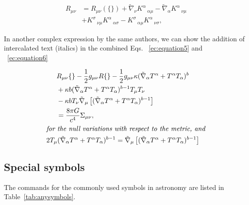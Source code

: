 \documentclass[9pt,article,twoside]{fapet-rho-class/fapet-rho}
\begin{document}
    \begin{equation} \label{ec:equation4}
	\begin{split}
    	R_{\mu\nu}&=R_{\mu\nu}(\{\})
    	+\tilde{\nabla}_\nu K^\alpha\,_{\alpha\mu}
    	-\tilde{\nabla}_\alpha K^\alpha\,_{\nu\mu}\\
    	&+K^\sigma\,_{\nu\mu} K^\alpha\,_{\alpha\sigma}
    	-K^\sigma\,_{\alpha\mu} K^\alpha\,_{\nu\sigma},
	\end{split}
    \end{equation}

    In another complex expression by the same authors, we can show the addition of intercalated text (italics) in the combined Eqs. ~\ref{ec:equation5} and ~\ref{ec:equation6}

    \begin{gather}
	\begin{split}
		&R_{\mu\nu}\{\}-\frac{1}{2}g_{\mu\nu}R\{\}
			-\frac{1}{2}g_{\mu\nu}\kappa(\tilde{\nabla}_\alpha
			T^\alpha+ T^\alpha T_\alpha)^b\\
		&+\kappa b(\tilde{\nabla}_\alpha T^\alpha+T^\alpha
			T_\alpha)^{b-1}T_\mu T_\nu \\ 
	        & -\kappa bT_\nu \tilde{\nabla}_\mu\left[(\tilde{\nabla}_\alpha
			T^\alpha+ T^\alpha T_\alpha)^{b-1}\right]\\
		&=\frac{8\pi G}{c^4} \Sigma_{\mu\nu},
	\end{split}
	\label{ec:equation5}
	\\
	\intertext{\textit{for the null variations with respect to the metric, and}}
	2T_\mu(\tilde{\nabla}_\alpha T^\alpha+ T^\alpha T_\alpha)^{b-1}=
		\tilde{\nabla}_\mu\left[(\tilde{\nabla}_\alpha T^\alpha+ T^\alpha T_\alpha)^{b-1}\right]
	\label{ec:equation6}
    \end{gather}

    \subsection{Special symbols}

        The commands for the commonly used symbols in astronomy are listed in Table~\ref{tab:anysymbols}.
\end{document}
